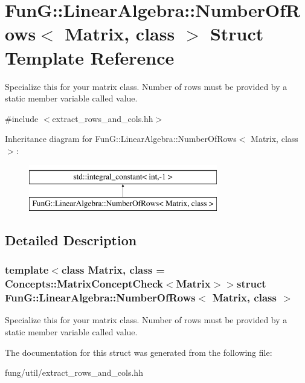 \hypertarget{structFunG_1_1LinearAlgebra_1_1NumberOfRows}{\section{Fun\-G\-:\-:Linear\-Algebra\-:\-:Number\-Of\-Rows$<$ Matrix, class $>$ Struct Template Reference}
\label{structFunG_1_1LinearAlgebra_1_1NumberOfRows}
}


Specialize this for your matrix class. Number of rows must be provided by a static member variable called value.  




{\ttfamily \#include $<$extract\-\_\-rows\-\_\-and\-\_\-cols.\-hh$>$}

Inheritance diagram for Fun\-G\-:\-:Linear\-Algebra\-:\-:Number\-Of\-Rows$<$ Matrix, class $>$\-:\begin{figure}[H]
\begin{center}
\leavevmode
\includegraphics[height=2.000000cm]{structFunG_1_1LinearAlgebra_1_1NumberOfRows}
\end{center}
\end{figure}


\subsection{Detailed Description}
\subsubsection*{template$<$class Matrix, class = Concepts\-::\-Matrix\-Concept\-Check$<$\-Matrix$>$$>$struct Fun\-G\-::\-Linear\-Algebra\-::\-Number\-Of\-Rows$<$ Matrix, class $>$}

Specialize this for your matrix class. Number of rows must be provided by a static member variable called value. 

The documentation for this struct was generated from the following file\-:\begin{DoxyCompactItemize}
\item 
fung/util/extract\-\_\-rows\-\_\-and\-\_\-cols.\-hh\end{DoxyCompactItemize}
